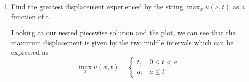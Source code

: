 \documentclass[a4paper,12pt]{article}
\begin{document}
\begin{enumerate}[label = \arabic*.]
\begin{enumerate}[label = (\alph*)]
				\item Find the greatest displacement experienced by the string $ \max_x u(x,t) $ as a function of t.
				
				Looking at our nested piecewise solution and the plot, we can see that the maximum displacement is given by the two middle intervals which can be expressed as
				\[
					\max_x u(x,t) = 
						\begin{cases}
							t, & 0 \leq t < a \\
							a, & a \leq t
						\end{cases}.
				\]
			\end{enumerate}
	\end{enumerate}	
\end{document}
